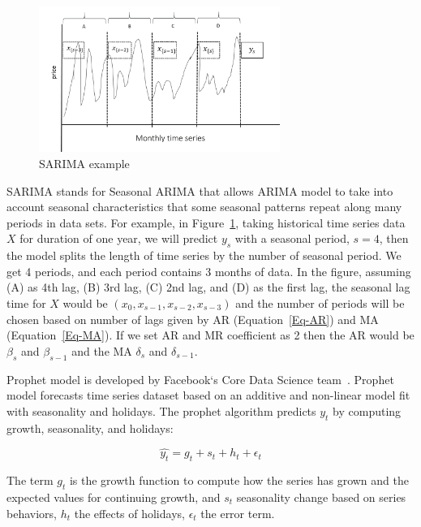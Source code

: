 \documentclass[graybox]{svmult}
\begin{document}
\begin{figure}
\centering\includegraphics[width=0.7\textwidth]{figures/SARIMA.png}\caption{SARIMA example}\label{fig:sarima}
\end{figure}

SARIMA stands for Seasonal ARIMA that allows ARIMA model to take into account seasonal characteristics that some seasonal patterns repeat along many periods in data sets. For example, in Figure~\ref{fig:sarima}, taking historical time series data \(X\) for duration of one year, we will predict \(y_s\) with a seasonal period, \(s= 4\), then the model splits the length of time series by the number of seasonal period. We get 4 periods, and each period contains 3 months of data. In the figure, assuming (A) as 4th lag, (B) 3rd lag, (C) 2nd lag, and (D) as the first lag, the seasonal lag time for \(X\) would be \((x_{0}, x_{{s-1}}, x_{{s-2}}, x_{{s-3}} )\) and the number of periods will be chosen based on number of lags given by AR (Equation~\ref{Eq-AR}) and MA (Equation~\ref{Eq-MA}). If we set AR and MR coefficient as 2 then the AR would be\(\beta_{s}\) and \(\beta_{s-1}\) and the MA \(\delta_{s}\) and \(\delta_{s-1}\).

Prophet model is developed by Facebook`s Core Data Science team~\cite{prophet}. Prophet model forecasts time series dataset based on an additive and non-linear model fit with seasonality and holidays. The prophet algorithm predicts \(y_t\) by computing growth, seasonality, and holidays:

\begin{equation}
\hat{y_t} = g_t + s_t +h_t+\epsilon_t
\label{Eq-prophet}
\end{equation}

The term \(g_t\) is the growth function to compute how the series has grown and the expected values for continuing growth, and \(s_t\) seasonality change based on series behaviors, \(h_t\) the effects of holidays, \(\epsilon_t\) the error term.
\end{document}
